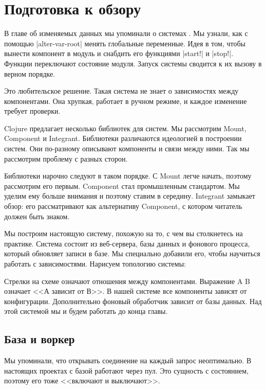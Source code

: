 \section{Подготовка к обзору}

В главе об изменяемых данных мы упоминали о системах . Мы
узнали, как с помощью \spverb|alter-var-root| менять глобальные переменные. Идея
в том, чтобы вынести компонент в модуль и снабдить его функциями \spverb|start!|
и \spverb|stop!|. Функции переключают состояние модуля. Запуск системы сводится
к их вызову в верном порядке.

Это любительское решение. Такая система не знает о зависимостях между
компонентами. Она хрупкая, работает в ручном режиме, и каждое изменение требует
проверки.

Clojure предлагает несколько библиотек для систем. Мы рассмотрим Mount,
Component и Integrant. Библиотеки различаются идеологией в построении
систем. Они по-разному описывают компоненты и связи между ними. Так мы
рассмотрим проблему с разных сторон.

Библиотеки нарочно следуют в таком порядке. С Mount легче начать, поэтому
рассмотрим его первым. Component стал промышленным стандартом. Мы уделим ему
больше внимания и поэтому ставим в середину. Integrant замыкает обзор: его
рассматривают как альтернативу Component, с котором читатель должен быть знаком.

Мы построим настоящую систему, похожую на то, с чем вы столкнетесь на
практике. Система состоит из веб-сервера, базы данных и фонового процесса,
который обновляет записи в базе. Мы специально добавили его, чтобы научиться
работать с зависимостями. Нарисуем топологию системы:


Стрелки на схеме означают отношения между компонентами. Выражение A \arr B
означает <<А зависит от В>>. В нашей системе все компоненты зависят от
конфигурации. Дополнительно фоновый обработчик зависит от базы данных. Над этой
системой мы и будем работать до конца главы.

\subsection{База и воркер}

Мы упоминали, что открывать соединение на каждый запрос неоптимально. В
настоящих проектах с базой работают через пул. Это сущность с состоянием,
поэтому его тоже <<включают и выключают>>.

